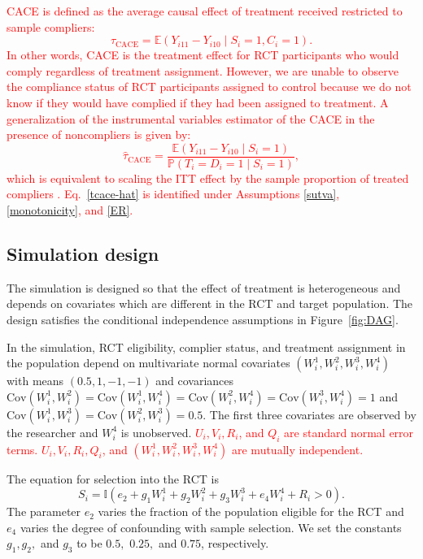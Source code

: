 \documentclass[hidelinks,12pt]{article}
\newcommand{\ind}{\mathbb{I}} %
\newcommand{\pr}{\mathbb{P}} %
\newcommand{\ex}{\mathbb{E}} %
\newcommand{\cov}{\mathrm{Cov}}
\begin{document}
\textcolor{red}{
CACE is defined as the average causal effect of treatment received restricted to sample compliers:
%	
\begin{equation}\label{tcace}
\tau_{\text{CACE}} = \ex\left( Y_{i11} - Y_{i10} \mid S_i=1, C_i=1\right).
\end{equation}	
%
In other words, CACE is the treatment effect for RCT participants who would comply regardless of treatment assignment. However, we are unable to observe the compliance status of RCT participants assigned to control because we do not know if they would have complied if they had been assigned to treatment. A generalization of the instrumental variables estimator of the CACE in the presence of noncompliers is given by:
%	
\begin{equation}\label{tcace-hat}
\hat{\tau}_{\text{CACE}} = \frac{\ex\left( Y_{i11} - Y_{i10} \mid S_i=1\right)}{\pr(T_i = D_i = 1 \mid S_i=1)},
\end{equation}	
%
which is equivalent to scaling the ITT effect by the sample proportion of treated compliers \citep[e.g.,][]{freedman2006}. Eq.~\eqref{tcace-hat} is identified under Assumptions \eqref{sutva}, \eqref{monotonicity}, and \eqref{ER}.}

\subsection{Simulation design}

The simulation is designed so that the effect of treatment is heterogeneous and depends on covariates which are different in the RCT and target population. The design satisfies the conditional independence assumptions in Figure~\ref{fig:DAG}.

In the simulation, RCT eligibility, complier status, and treatment assignment in the population depend on multivariate normal covariates $(W^{1}_i, W^{2}_i, W^{3}_i, W^{4}_i)$ with means $(0.5, 1, -1, -1)$ and covariances $\cov(W^{1}_i, W^{2}_i) = \cov(W^{1}_i, W^{4}_i)= \cov(W^{2}_i, W^{4}_i) = \cov(W^{3}_i, W^{4}_i) = 1$ and $\cov(W^{1}_i, W^{3}_i) = \cov(W^{2}_i, W^{3}_i) = 0.5$.  The first three covariates are observed by the researcher and $W^{4}_i$ is unobserved. \textcolor{red}{$U_i, V_i, R_i$, and $Q_i$ are standard normal error terms. $U_i, V_i, R_i, Q_i$, and $(W^{1}_i, W^{2}_i, W^{3}_i, W^{4}_i)$ are mutually independent.} 

The equation for selection into the RCT is
%	
\begin{equation*}
S_i = \ind(e_2 + g_1W^{1}_i + g_2W^{2}_i + g_3W^{3}_i + e_4W^{4}_i + R_i > 0).
\end{equation*}	
%
The parameter $e_2$ varies the fraction of the population eligible for the RCT and $e_4$ varies the degree of confounding with sample selection. We set the constants $g_1, g_2,$ and $g_3$ to be $0.5,$ $0.25,$ and $0.75$, respectively. 
\end{document}
